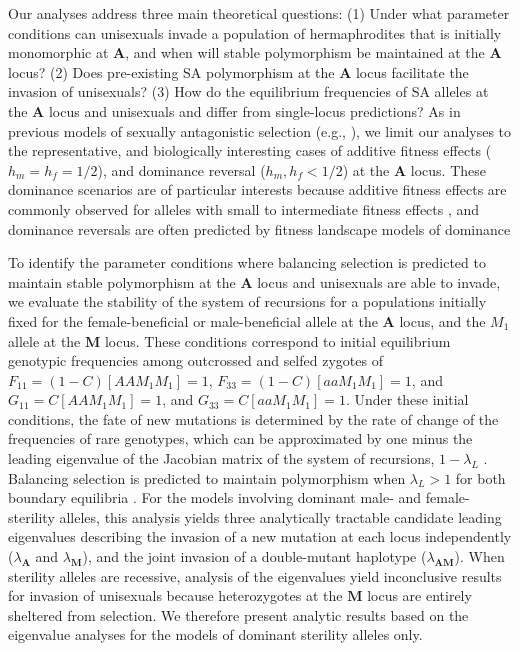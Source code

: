 \documentclass[9pt,twocolumn,twoside,lineno]{gsajnl}
\begin{document}
Our analyses address three main theoretical questions: (1) Under what parameter conditions can unisexuals invade a population of hermaphrodites that is initially monomorphic at $\mathbf{A}$, and when will stable polymorphism be maintained at the $\mathbf{A}$ locus? (2) Does pre-existing SA polymorphism at the $\mathbf{A}$ locus facilitate the invasion of unisexuals? (3) How do the equilibrium frequencies of SA alleles at the $\mathbf{A}$ locus and unisexuals and differ from single-locus predictions? As in previous models of sexually antagonistic selection (e.g., \citealp{Kidwell1977,Prout2000,JordanConnallon2014}), we limit our analyses to the representative, and biologically interesting cases of additive fitness effects ($h_m = h_f = 1/2$), and dominance reversal ($h_m, h_f < 1/2$) at the $\mathbf{A}$ locus. These dominance scenarios are of particular interests because additive fitness effects are commonly observed for alleles with small to intermediate fitness effects \citep{Agrawal2011}, and dominance reversals are often predicted by fitness landscape models of dominance \citep{Manna2011, ConnallonClark2014}

To identify the parameter conditions where balancing selection is predicted to maintain stable polymorphism at the $\mathbf{A}$ locus and unisexuals are able to invade, we evaluate the stability of the system of recursions for a populations initially fixed for the female-beneficial or male-beneficial allele at the $\mathbf{A}$ locus, and the $M_1$ allele at the $\mathbf{M}$ locus. These conditions correspond to initial equilibrium genotypic frequencies among outcrossed and selfed zygotes of $F_{11} = (1 - C) [AAM_1M_1] = 1$, $F_{33} = (1 - C) [aaM_1M_1] = 1$, and $G_{11} = C [AAM_1M_1] = 1$, and $G_{33} = C [aaM_1M_1] = 1$. Under these initial conditions, the fate of new mutations is determined by the rate of change of the frequencies of rare genotypes, which can be approximated by one minus the leading eigenvalue of the Jacobian matrix of the system of recursions, $1 - \lambda_L$ \citep{OttoDay2007}. Balancing selection is predicted to maintain polymorphism when $\lambda_L > 1$ for both boundary equilibria \citep{Prout1968,OttoDay2007}. For the models involving dominant male- and female-sterility alleles, this analysis yields three analytically tractable candidate leading eigenvalues describing the invasion of a new mutation at each locus independently ($\lambda_\mathbf{A}$ and $\lambda_\mathbf{M}$), and the joint invasion of a double-mutant haplotype ($\lambda_\mathbf{AM}$). When sterility alleles are recessive, analysis of the eigenvalues yield inconclusive results for invasion of unisexuals because heterozygotes at the $\mathbf{M}$ locus are entirely sheltered from selection. We therefore present analytic results based on the eigenvalue analyses for the models of dominant sterility alleles only.
\end{document}
